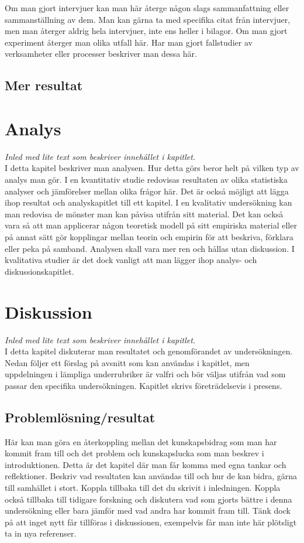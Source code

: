\documentclass[a4paper,12pt]{article} %
\begin{document}
Om man gjort intervjuer kan man här återge någon slags sammanfattning eller sammanställning av dem. Man kan gärna ta med specifika citat från intervjuer, men man återger aldrig hela intervjuer, inte ens heller i bilagor. Om man gjort experiment återger man olika utfall här. Har man gjort fallstudier av verksamheter eller processer beskriver man dessa här.

\subsection{Mer resultat}

\newpage

\section{Analys}
\emph{Inled med lite text som beskriver innehållet i kapitlet.}\\
I detta kapitel beskriver man analysen. Hur detta görs beror helt på vilken typ av analys man gör. I en kvantitativ studie redovisas resultaten av olika statistiska analyser och jämförelser mellan olika frågor här. Det är också möjligt att lägga ihop resultat och analyskapitlet till ett kapitel. I en kvalitativ undersökning kan man redovisa de mönster man kan påvisa utifrån sitt material. Det kan också vara så att man applicerar någon teoretisk modell på sitt empiriska material eller på annat sätt gör kopplingar mellan teorin och empirin för att beskriva, förklara eller peka på samband. Analysen skall vara mer ren och hållas utan diskussion. I kvalitativa studier är det dock vanligt att man lägger ihop analys- och diskussionskapitlet.

\newpage

\section{Diskussion}
\emph{Inled med lite text som beskriver innehållet i kapitlet.}\\
I detta kapitel diskuterar man resultatet och genomförandet av undersökningen. Nedan följer ett förslag på avsnitt som kan användas i kapitlet, men uppdelningen i lämpliga underrubriker är valfri och bör väljas utifrån vad som passar den specifika undersökningen. Kapitlet skrivs företrädelsevis i presens.

\subsection{Problemlösning/resultat}
Här kan man göra en återkoppling mellan det kunskapsbidrag som man har kommit fram till och det problem och kunskapslucka som man beskrev i introduktionen. Detta är det kapitel där man får komma med egna tankar och reflektioner. Beskriv vad resultaten kan användas till och hur de kan bidra, gärna till samhället i stort. Koppla tillbaka till det du skrivit i inledningen. Koppla också tillbaka till tidigare forskning och diskutera vad som gjorts bättre i denna undersökning eller bara jämför med vad andra har kommit fram till. Tänk dock på att inget nytt får tillföras i diskussionen, exempelvis får man inte här plötsligt ta in nya referenser.
\end{document}
